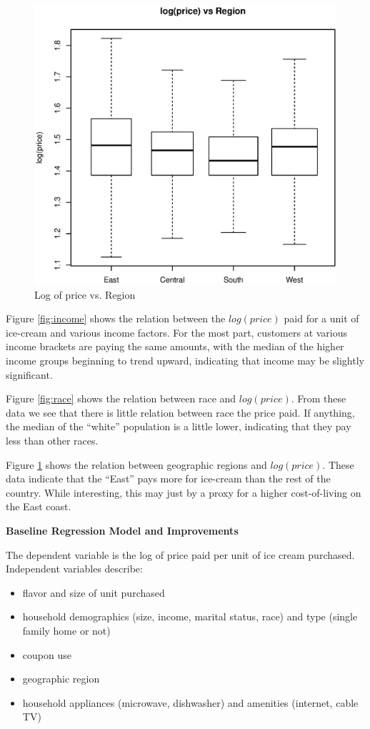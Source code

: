 \documentclass[11pt, fleqn]{article}
\begin{document}
\begin{figure}[!htb]
  \centering
  \includegraphics[scale=.5]{region.eps}
  \caption{Log of price vs. Region}
  \label{fig:region}
\end{figure}

Figure \ref{fig:income} shows the relation between the $log(price)$ paid for a unit of ice-cream and various income factors.  For the most part, customers at various income brackets are paying the same amounts, with the median of the higher income groups beginning to trend upward, indicating that income may be slightly significant.

Figure \ref{fig:race} shows the relation between race and $log(price)$.  From these data we see that there is little relation between race the price paid.  If anything, the median of the ``white'' population is a little lower, indicating that they pay less than other races.

Figure \ref{fig:region} shows the relation between geographic regions and $log(price)$.  These data indicate that the ``East'' pays more for ice-cream than the rest of the country.  While interesting, this may just by a proxy for a higher cost-of-living on the East coast.

\textbf{Baseline Regression Model and Improvements}

The dependent variable is the log of price paid per unit of ice cream purchased. Independent variables describe:
\begin{itemize}
  \item flavor and size of unit purchased
  \item household demographics (size, income, marital status, race) and type (single family home or not)
  \item coupon use
  \item geographic region
  \item household appliances (microwave, dishwasher) and amenities (internet, cable TV)
\end{itemize}
\end{document}
